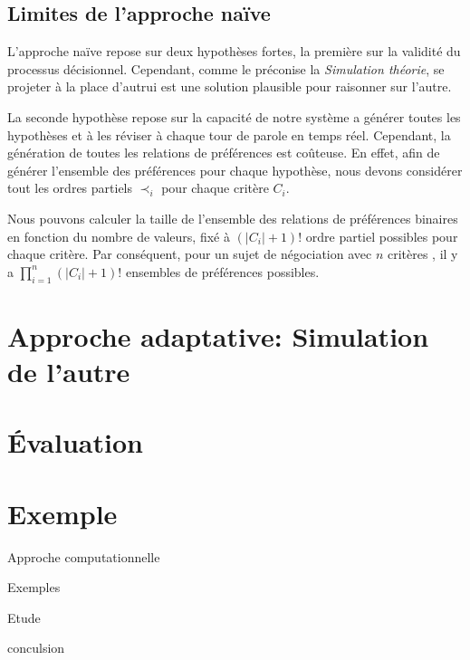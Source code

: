 		\subsection{Limites de l'approche naïve}
			L'approche naïve repose sur deux hypothèses fortes, la première sur la validité du processus décisionnel. Cependant, comme le préconise la \emph{Simulation théorie}, se projeter à la place d'autrui est une solution plausible pour raisonner sur l'autre.
			
			La seconde hypothèse repose sur la capacité de notre système a générer toutes les hypothèses et à les réviser à chaque tour de parole en temps réel. Cependant, la génération de toutes les relations de préférences est coûteuse. En effet, afin de générer l'ensemble des préférences pour chaque hypothèse, nous devons considérer tout les ordres partiels $\prec_i$ pour chaque critère $C_i$.
			
			Nous pouvons calculer la taille de l'ensemble des relations de préférences binaires en fonction du nombre de valeurs, fixé à $(|C_i|+1)! $ ordre partiel possibles pour chaque critère. Par conséquent, pour un sujet de négociation avec $n$ critères , il y a $\prod_{i=1}^n (|C_i|+1)!$ ensembles de préférences possibles.
			
			

\section{Approche adaptative: Simulation de l'autre}
	
\section{Évaluation}

\section{Exemple}


Approche computationnelle

Exemples

Etude

conculsion